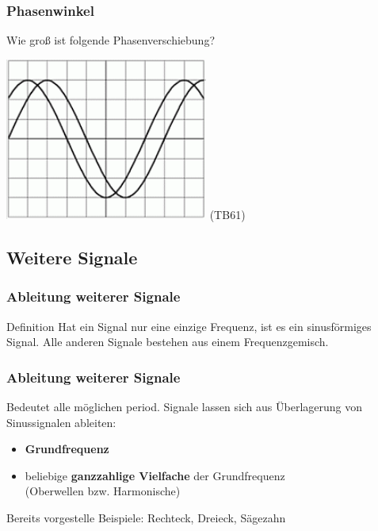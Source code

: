 \begin{frame}
    \frametitle{Phasenwinkel}

    \begin{block}{
        Wie groß ist folgende Phasenverschiebung?
        \begin{center}
            \includegraphics[width=0.5\textwidth]{a11/TB612.png}
            \tiny (TB61)
        \end{center}
    }
    \end{block}


\end{frame}

\subsection{Weitere Signale}

\begin{frame}
    \frametitle{Ableitung weiterer Signale}

	\begin{block}{Definition}
      Hat ein Signal nur eine einzige Frequenz, ist es ein sinusförmiges Signal. Alle anderen Signale bestehen aus einem Frequenzgemisch.
    \end{block}

\end{frame}

\begin{frame}
    \frametitle{Ableitung weiterer Signale}

	Bedeutet alle möglichen period. Signale lassen sich aus Überlagerung von
    Sinussignalen ableiten:

    \begin{itemize}
        \item \textbf{Grundfrequenz}
        \item beliebige \textbf{ganzzahlige Vielfache} der Grundfrequenz \\
              (Oberwellen bzw. Harmonische)
    \end{itemize}

    \bigskip Bereits vorgestelle Beispiele: Rechteck, Dreieck, Sägezahn

\end{frame}

